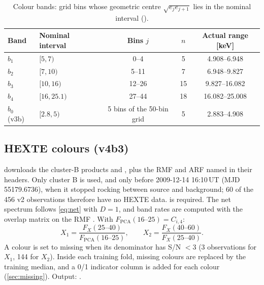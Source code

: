 \begin{table}[htbp]
\centering\small
\caption{Colour bands: grid bins whose geometric centre $\sqrt{e_je_{j+1}}$ lies in the nominal interval
().}\label{tab:bands}
\begin{tabular}{@{}l l c c c@{}}
\toprule
Band & Nominal interval & Bins $j$ & $n$ & Actual range [keV] \\
\midrule
$b_1$ & $[5,7)$ & 0--4 & 5 & 4.908--6.948 \\
$b_2$ & $[7,10)$ & 5--11 & 7 & 6.948--9.827 \\
$b_3$ & $[10,16)$ & 12--26 & 15 & 9.827--16.082 \\
$b_4$ & $[16,25.1)$ & 27--44 & 18 & 16.082--25.008 \\
$b_0$ (v3b) & $[2.8,5)$ & 5 bins of the 50-bin grid & 5 & 2.883--4.908 \\
\bottomrule
\end{tabular}
\end{table}

\subsection{HEXTE colours (v4b3)}\label{sec:hexte}
 downloads the cluster-B products  and , plus the RMF and ARF
named in their headers. Only cluster B is used, and only before 2009-12-14 16:10\,UT (MJD 55179.6736), when it stopped
rocking between source and background; 60 of the 456 v2 observations therefore have no HEXTE data.  is
required. The net spectrum follows \cref{eq:net} with $D=1$, and band rates are computed with the overlap matrix on the RMF
. With $F_\mathrm{PCA}(16\text{--}25)=C_{i,4}$:
\begin{equation}
X_1=\frac{F_X(25\text{--}40)}{F_\mathrm{PCA}(16\text{--}25)},\qquad X_2=\frac{F_X(40\text{--}60)}{F_X(25\text{--}40)}.\label{eq:hexte}
\end{equation}
A colour is set to missing when its denominator has S/N $<3$ (3 observations for $X_1$, 144 for $X_2$). Inside each
training fold, missing colours are replaced by the training median, and a 0/1 indicator column is added for each colour
(\cref{sec:missing}). Output: .

